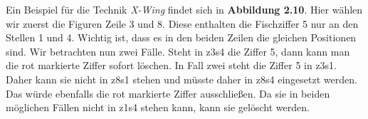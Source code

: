 \noindent Ein Beispiel für die Technik \textit{X-Wing} findet sich in \textbf{Abbildung 2.10}. Hier wählen wir zuerst die Figuren Zeile 3 und 8. Diese enthalten die Fischziffer 5 nur an den Stellen 1 und 4. Wichtig ist, dass es in den beiden Zeilen die gleichen Positionen sind. Wir betrachten nun zwei Fälle. Steht in z3s4 die Ziffer 5, dann kann man die rot markierte Ziffer sofort löschen. In Fall zwei steht die Ziffer 5 in z3s1. Daher kann sie nicht in z8s1 stehen und müsste daher in z8s4 eingesetzt werden. Das würde ebenfalls die rot markierte Ziffer ausschließen. Da sie in beiden möglichen Fällen nicht in z1s4 stehen kann, kann sie gelöscht werden.